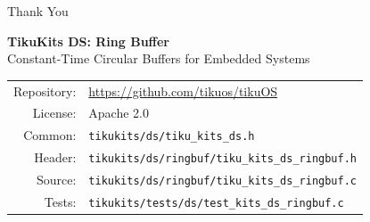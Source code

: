 \documentclass[aspectratio=169, 10pt]{beamer}
\begin{document}
\begin{frame}{Thank You}
\begin{center}
\Large\textbf{TikuKits DS: Ring Buffer}\\[0.5em]
\normalsize Constant-Time Circular Buffers for Embedded Systems\\[1.5em]

\begin{tabular}{rl}
  Repository: & \url{https://github.com/tikuos/tikuOS} \\
  License:    & Apache 2.0 \\
  Common:     & \texttt{tikukits/ds/tiku\_kits\_ds.h} \\
  Header:     & \texttt{tikukits/ds/ringbuf/tiku\_kits\_ds\_ringbuf.h} \\
  Source:     & \texttt{tikukits/ds/ringbuf/tiku\_kits\_ds\_ringbuf.c} \\
  Tests:      & \texttt{tikukits/tests/ds/test\_kits\_ds\_ringbuf.c} \\
\end{tabular}
\end{center}
\end{frame}
\end{document}
